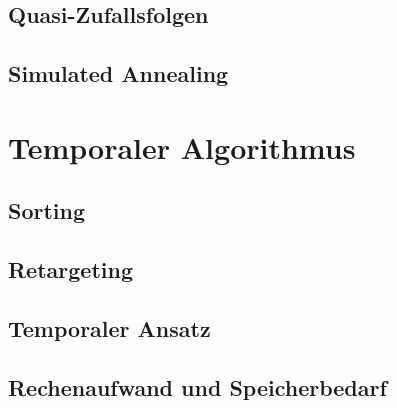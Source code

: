 \newpage
\section{Quasi-Zufallsfolgen}
\label{ch:Content1:sec:Quasi-Zufallsfolgen}



\newpage
\section{Simulated Annealing}
\label{ch:Content2:sec:Simulated Annealing}




\newpage
\chapter{Temporaler Algorithmus}
\label{ch:Temporaler Algorithmus}





\newpage
\section{Sorting}
\label{ch:Content2:sec:Sorting}




\newpage
\section{Retargeting}
\label{ch:Content2:sec:Retargeting}


\newpage
\section{Temporaler Ansatz}
\label{ch:Content2:sec:Temporaler Ansatz}


\newpage
\section{Rechenaufwand und Speicherbedarf}
\label{ch:Content2:sec:Rechenaufwand}





